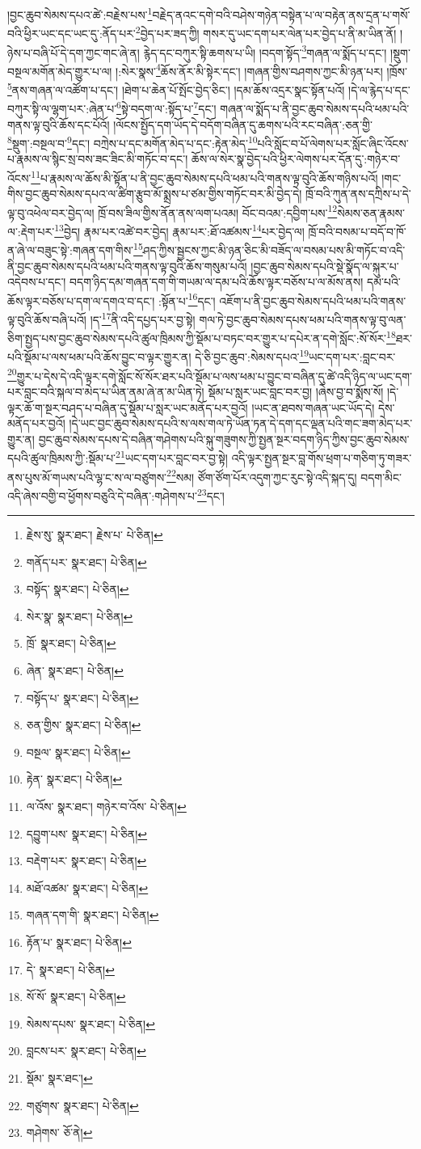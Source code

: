 །བྱང་ཆུབ་སེམས་དཔའ་ཚེ་:བརྗེས་པས་\footnote{རྗེས་སུ་  སྣར་ཐང་། རྗེས་པ་  པེ་ཅིན། }བརྗེད་ནའང་དགེ་བའི་བཤེས་གཉེན་བསྟེན་པ་ལ་བརྟེན་ནས་དྲན་པ་གསོ་བའི་ཕྱིར་ཡང་དང་ཡང་དུ་:ནོད་པར་\footnote{གནོད་པར་  སྣར་ཐང་།  པེ་ཅིན། }བྱེད་པར་ཟད་ཀྱི། གསར་དུ་ཡང་དག་པར་ལེན་པར་བྱེད་པ་ནི་མ་ཡིན་ནོ། །ཉེས་པ་བཞི་པོ་དེ་དག་ཀྱང་གང་ཞེ་ན། རྙེད་དང་བཀུར་སྟི་ཆགས་པ་ཡི། །བདག་སྟོད་\footnote{བསྟོད་  སྣར་ཐང་།  པེ་ཅིན། }གཞན་ལ་སྨོད་པ་དང་། །སྡུག་བསྔལ་མགོན་མེད་གྱུར་པ་ལ། །:སེར་སྣས་\footnote{སེར་སྣ་  སྣར་ཐང་།  པེ་ཅིན། }ཆོས་ནོར་མི་སྟེར་དང་། །གཞན་གྱིས་བཤགས་ཀྱང་མི་ཉན་པར། །ཁྲོས་\footnote{ཁྲོ་  སྣར་ཐང་།  པེ་ཅིན། }ནས་གཞན་ལ་འཚོག་པ་དང་། །ཐེག་པ་ཆེན་པོ་སྤོང་བྱེད་ཅིང་། །དམ་ཆོས་འདྲར་སྣང་སྟོན་པའོ། །དེ་ལ་རྙེད་པ་དང་བཀུར་སྟི་ལ་ལྷག་པར་:ཞེན་པ་\footnote{ཞེན་  སྣར་ཐང་།  པེ་ཅིན། }སྟེ་བདག་ལ་:སྟོད་པ་\footnote{བསྟོད་པ་  སྣར་ཐང་།  པེ་ཅིན། }དང་། གཞན་ལ་སྨོད་པ་ནི་བྱང་ཆུབ་སེམས་དཔའི་ཕམ་པའི་གནས་ལྟ་བུའི་ཆོས་དང་པོའོ། །ལོངས་སྤྱོད་དག་ཡོད་དེ་བདོག་བཞིན་དུ་ཆགས་པའི་རང་བཞིན་:ཅན་གྱི་\footnote{ཅན་གྱིས་  སྣར་ཐང་།  པེ་ཅིན། }སྡུག་:བསྔལ་བ་\footnote{བསྔལ་  སྣར་ཐང་།  པེ་ཅིན། }དང་། བཀྲེས་པ་དང་མགོན་མེད་པ་དང་:རྟེན་མེད་\footnote{རྟེན་  སྣར་ཐང་།  པེ་ཅིན། }པའི་སློང་བ་པོ་ལེགས་པར་སློང་ཞིང་འོངས་པ་རྣམས་ལ་སྙིང་སྲ་བས་ཟང་ཟིང་མི་གཏོང་བ་དང་། ཆོས་ལ་སེར་སྣ་བྱེད་པའི་ཕྱིར་ལེགས་པར་དོན་དུ་:གཉེར་བ་འོངས་\footnote{ལ་འོས་  སྣར་ཐང་། གཉེར་བ་འོས་  པེ་ཅིན། }པ་རྣམས་ལ་ཆོས་མི་སྟོན་པ་ནི་བྱང་ཆུབ་སེམས་དཔའི་ཕམ་པའི་གནས་ལྟ་བུའི་ཆོས་གཉིས་པའོ། །གང་གིས་བྱང་ཆུབ་སེམས་དཔའ་ལ་ཚིག་རྩུབ་མོ་སྨྲས་པ་ཙམ་གྱིས་གཏོང་བར་མི་བྱེད་དེ། ཁྲོ་བའི་ཀུན་ནས་དཀྲིས་པ་དེ་ལྟ་བུ་འཕེལ་བར་བྱེད་ལ། ཁྲོ་བས་ཟིལ་གྱིས་ནོན་ནས་ལག་པའམ། བོང་བའམ་:དབྱིག་པས་\footnote{དབྱུག་པས་  སྣར་ཐང་།  པེ་ཅིན། }སེམས་ཅན་རྣམས་ལ་:རྡེག་པར་\footnote{བརྡེག་པར་  སྣར་ཐང་།  པེ་ཅིན། }བྱེད། རྣམ་པར་འཚེ་བར་བྱེད། རྣམ་པར་:ཐོ་འཚམས་\footnote{མཐོ་འཚམ་  སྣར་ཐང་།  པེ་ཅིན། }པར་བྱེད་ལ། ཁྲོ་བའི་བསམ་པ་བདོ་བ་ཁོ་ན་ཞེ་ལ་བཟུང་སྟེ་:གཞན་དག་གིས་\footnote{གཞན་དག་གི་  སྣར་ཐང་།  པེ་ཅིན། }ཤད་ཀྱིས་སྦྱངས་ཀྱང་མི་ཉན་ཅིང་མི་བཟོད་ལ་བསམ་པས་མི་གཏོང་བ་འདི་ནི་བྱང་ཆུབ་སེམས་དཔའི་ཕམ་པའི་གནས་ལྟ་བུའི་ཆོས་གསུམ་པའོ། །བྱང་ཆུབ་སེམས་དཔའི་སྡེ་སྣོད་ལ་སྐུར་པ་འདེབས་པ་དང་། བདག་ཉིད་དམ་གཞན་དག་གི་གཡམ་ལ་དམ་པའི་ཆོས་ལྟར་བཅོས་པ་ལ་མོས་ནས། དམ་པའི་ཆོས་ལྟར་བཅོས་པ་དག་ལ་དགའ་བ་དང་། :སྟོན་པ་\footnote{རྟོན་པ་  སྣར་ཐང་།  པེ་ཅིན། }དང་། འཇོག་པ་ནི་བྱང་ཆུབ་སེམས་དཔའི་ཕམ་པའི་གནས་ལྟ་བུའི་ཆོས་བཞི་པའོ། །ད་\footnote{དེ་  སྣར་ཐང་།  པེ་ཅིན། }ནི་འདི་དཔྱད་པར་བྱ་སྟེ། གལ་ཏེ་བྱང་ཆུབ་སེམས་དཔས་ཕམ་པའི་གནས་ལྟ་བུ་ལན་ཅིག་སྤྱད་པས་བྱང་ཆུབ་སེམས་དཔའི་ཚུལ་ཁྲིམས་ཀྱི་སྡོམ་པ་བཏང་བར་གྱུར་པ་དཔེར་ན་དགེ་སློང་:སོ་སོར་\footnote{སོ་སོ་  སྣར་ཐང་།  པེ་ཅིན། }ཐར་པའི་སྡོམ་པ་ལས་ཕམ་པའི་ཆོས་བྱུང་བ་ལྟར་གྱུར་ན། དེ་ཅི་བྱང་ཆུབ་:སེམས་དཔའ་\footnote{སེམས་དཔས་  སྣར་ཐང་།  པེ་ཅིན། }ཡང་དག་པར་:བླང་བར་\footnote{བླངས་པར་  སྣར་ཐང་།  པེ་ཅིན། }གྱུར་པ་དེས་དེ་འདི་ལྟར་དགེ་སློང་སོ་སོར་ཐར་པའི་སྡོམ་པ་ལས་ཕམ་པ་བྱུང་བ་བཞིན་དུ་ཚེ་འདི་ཉིད་ལ་ཡང་དག་པར་བླང་བའི་སྐལ་བ་མེད་པ་ཡིན་ནམ་ཞེ་ན་མ་ཡིན་ཏེ། སྡོམ་པ་སླར་ཡང་བླང་བར་བྱ། །ཞེས་བྱ་བ་སྨོས་སོ། །དེ་ལྟར་ཆོ་ག་སྔར་བཤད་པ་བཞིན་དུ་སྡོམ་པ་སླར་ཡང་མནོད་པར་བྱའོ། །ཡང་ན་ཐབས་གཞན་ཡང་ཡོད་དེ། དེས་མནོད་པར་བྱའོ། །དེ་ཡང་བྱང་ཆུབ་སེམས་དཔའི་ས་ལས་གལ་ཏེ་ཡོན་ཏན་དེ་དག་དང་ལྡན་པའི་གང་ཟག་མེད་པར་གྱུར་ན། བྱང་ཆུབ་སེམས་དཔས་དེ་བཞིན་གཤེགས་པའི་སྐུ་གཟུགས་ཀྱི་སྤྱན་སྔར་བདག་ཉིད་ཀྱིས་བྱང་ཆུབ་སེམས་དཔའི་ཚུལ་ཁྲིམས་ཀྱི་:སྡོམ་པ་\footnote{སྡོམ་  སྣར་ཐང་། }ཡང་དག་པར་བླང་བར་བྱ་སྟེ། འདི་ལྟར་སྤྱན་སྔར་བླ་གོས་ཕྲག་པ་གཅིག་ཏུ་གཟར་ནས་པུས་མོ་གཡས་པའི་ལྷ་ང་ས་ལ་བཙུགས་\footnote{གཙུགས་  སྣར་ཐང་།  པེ་ཅིན། }སམ། ཙོག་ཙོག་པོར་འདུག་ཀྱང་རུང་སྟེ་འདི་སྐད་དུ། བདག་མིང་འདི་ཞེས་བགྱི་བ་ཕྱོགས་བཅུའི་དེ་བཞིན་:གཤེགས་པ་\footnote{གཤེགས་  ཅོ་ནེ། }དང་། 
